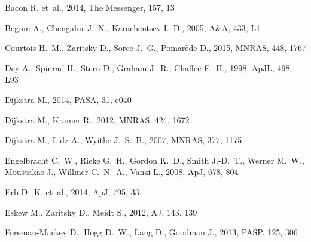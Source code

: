 \documentclass[a4,useAMS,usenatbib,usegraphicx]{mn2e}
\newcommand{\apj}{ApJ}
\newcommand{\pasa}{PASA}
\newcommand{\apjl}{ApJL}
\newcommand{\aj}{AJ}
\newcommand{\mnras}{MNRAS}
\newcommand{\aap}{A\&A}
\newcommand{\pasp}{PASP}
\begin{document}

%
\begin{thebibliography}{}

{Bacon} R.  et~al., 2014, The Messenger, 157, 13

{Begum} A.,  {Chengalur} J.~N.,    {Karachentsev} I.~D.,  2005, \aap, 433, L1

{Courtois} H.~M.,  {Zaritsky} D.,  {Sorce} J.~G.,    {Pomar{\`e}de} D.,  2015,
  \mnras, 448, 1767

{Dey} A.,  {Spinrad} H.,  {Stern} D.,  {Graham} J.~R.,    {Chaffee} F.~H.,
  1998, \apjl, 498, L93

{Dijkstra} M.,  2014, \pasa, 31, e040

{Dijkstra} M.,  {Kramer} R.,  2012, \mnras, 424, 1672

{Dijkstra} M.,  {Lidz} A.,    {Wyithe} J.~S.~B.,  2007, \mnras, 377, 1175

{Engelbracht} C.~W.,  {Rieke} G.~H.,  {Gordon} K.~D.,  {Smith} J.-D.~T.,
  {Werner} M.~W.,  {Moustakas} J.,  {Willmer} C.~N.~A.,    {Vanzi} L.,  2008,
  \apj, 678, 804

{Erb} D.~K.  et~al., 2014, \apj, 795, 33

{Eskew} M.,  {Zaritsky} D.,    {Meidt} S.,  2012, \aj, 143, 139

{Foreman-Mackey} D.,  {Hogg} D.~W.,  {Lang} D.,    {Goodman} J.,  2013, \pasp,
  125, 306


\end{thebibliography}
\end{document}
